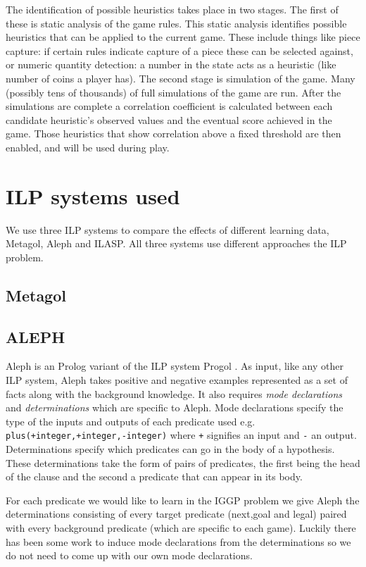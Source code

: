 \documentclass[a4paper,12pt]{report}
\begin{document}
The identification of possible heuristics takes place in two stages. The first of these is static analysis of the game rules. This static analysis identifies possible heuristics that can be applied to the current game. These include things like piece capture: if certain rules indicate capture of a piece these can be selected against, or numeric quantity detection: a number in the state acts as a heuristic (like number of coins a player has). The second stage is simulation of the game. Many (possibly tens of thousands) of full simulations of the game are run. After the simulations are complete a correlation coefficient is calculated between each candidate heuristic's observed values and the eventual score achieved in the game. Those heuristics that show correlation above a fixed threshold are then enabled, and will be used during play.

\chapter{ILP systems used}
We use three ILP systems to compare the effects of different learning data, Metagol, Aleph and ILASP. All three systems use different approaches the ILP problem.
\section{Metagol}

\section{ALEPH}
Aleph is an Prolog variant of the ILP system Progol \cite{Muggleton/Aleph}. As input, like any other ILP system, Aleph takes positive and negative examples represented as a set of facts along with the background knowledge. It also requires \textit{mode declarations} and \textit{determinations} which are specific to Aleph. Mode declarations specify the type of the inputs and outputs of each predicate used e.g. \texttt{plus(+integer,+integer,-integer)} where \texttt{+} signifies an input and \texttt{-} an output.
Determinations specify which predicates can go in the body of a hypothesis. These determinations take the form of pairs of predicates, the first being the head of the clause and the second a predicate that can appear in its body.

For each predicate we would like to learn in the IGGP problem we give Aleph the determinations consisting of every target predicate (next,goal and legal) paired with every background predicate (which are specific to each game). Luckily there has been some work to induce mode declarations from the determinations \cite{McCreath/Meta-extraction} so we do not need to come up with our own mode declarations.
\end{document}
